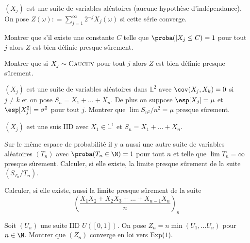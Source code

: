 \documentclass{report}
\begin{document}
\begin{exo}
    \((X_j)\) est une suite de variables aléatoires (aucune hypothèse d'indépendance).
    On pose \(Z(\omega)\colon=\sum_{j=1}^\infty 2^{-j}X_j(\omega)\) si cette série converge.
    \begin{q}{1}
        Montrer que s'il existe une constante \(C\) telle que \(\proba(|X_j \leq C) = 1\)
        pour tout \(j\) alors \(Z\) est bien définie presque sûrement.
    \end{q}
    \begin{q}{2}
        Montrer que si \(X_j\sim \textsc{Cauchy}\) pour tout \(j\) alors \(Z\) est
        bien définie presque sûrement.
    \end{q}
\end{exo}

\begin{exo}
    \((X_j)\) est une suite de variables aléatoires dans \(\mathbb{L}^2\) avec \(\cov(X_j,X_k)=0\) si \(j\neq k\)
    et on pose \(S_n = X_1+\dots+X_n\). De plus on suppose \(\esp[X_j]=\mu\) et \(\esp[X_j^2]=\sigma^2\) pour tout \(j\).
    Montrer que \(\lim S_{n^2}/n^2 = \mu\) presque sûrement.
\end{exo}

\begin{exo}
    \((X_j)\) est une suis IID avec \(X_1\in\mathbb{L}^1\) et \(S_n=X_1+\dots+X_n\).
    \begin{q}{1}
        Sur le même espace de probabilité il y a aussi une autre suite de variables
        aléatoires \((T_n)\) avec \(\proba(T_n\in\N)=1\) pour tout \(n\) et telle que
        \(\lim T_n=\infty\) presque sûrement. Calculer, si elle existe, la limite presque
        sûrement de la suite \((S_{T_n}/T_n)\).
    \end{q}
    \begin{q}{2}
        Calculer, si elle existe, aussi la limite presque sûrement de la suite
        \[\left(\frac{X_1X_2+X_2X_3+\dots+X_{n-1}X_n}{n}\right)_n\]
    \end{q}
\end{exo}

\begin{exo}
    Soit \((U_n)\) une suite IID \(U([0,1])\). On pose \(Z_n=n\min(U_1, \dots U_n)\)
    pour \(n\in\N\). Montrer que \((Z_n)\) converge en loi vers Exp(\(1\)).
\end{exo}
\end{document}
